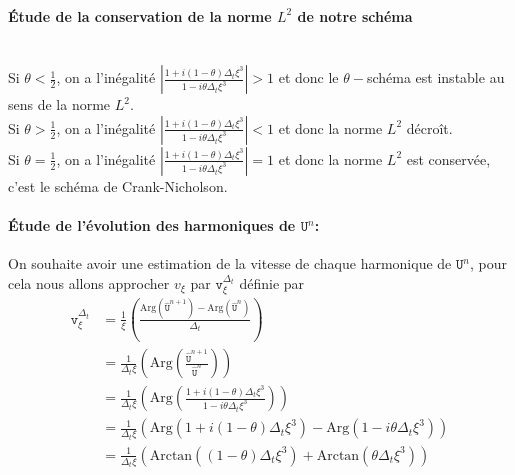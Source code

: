 \documentclass[12pt,a4paper]{article}
\numberwithin{equation}{section}
\begin{document}
\paragraph{Étude de la conservation de la norme $L^2$ de notre schéma}\,
\\

Si $\theta < \frac{1}{2}$, on a l'inégalité $\left|\frac{1 + i (1-\theta)\Delta_t\xi^3}{1 - i\theta \Delta_t\xi^3 }\right|>1 $  et donc le $\theta-$schéma est instable au sens de la norme $L^2$.\\

Si $\theta > \frac{1}{2}$, on a l'inégalité $\left|\frac{1 + i (1-\theta)\Delta_t\xi^3}{1 - i\theta \Delta_t\xi^3 }\right|<1 $ et donc la norme $L^2$ décroît.\\

Si $\theta = \frac{1}{2}$, on a l'inégalité $\left|\frac{1 + i (1-\theta)\Delta_t\xi^3}{1 - i\theta \Delta_t\xi^3 }\right| = 1$ et donc la norme $L^2$ est conservée, c'est le schéma de Crank-Nicholson.\\

\paragraph{Étude de l'évolution des harmoniques de $\texttt{U}^n$:} 
On souhaite avoir une estimation de la vitesse de chaque harmonique de $\texttt{U}^n$, pour cela nous allons approcher $v_\xi$ par $ \texttt{v}_\xi^{\Delta_t}$ définie par
\begin{equation}
\begin{split}
     \texttt{v}_\xi^{\Delta_t} &= \frac{1}{\xi}\left( \frac{\text{Arg}(\widehat{\texttt{U}}^{n+1}) - \text{Arg}(\widehat{\texttt{U}}^{n})}{\Delta_t} \right)
    \\ & =\frac{1}{\Delta_t\xi}\left(\text{Arg}\left( \frac{\widehat{\texttt{U}}^{n+1}}{\widehat{\texttt{U}}^{n}}\right)\right) 
    \\ & = \frac{1}{\Delta_t\xi}\left(\text{Arg}\left(\frac{1 + i (1-\theta)\Delta_t\xi^3}{1 - i\theta \Delta_t\xi^3 }\right)\right)
    \\ & = \frac{1}{\Delta_t\xi}\left(\text{Arg}\left(1 + i (1-\theta)\Delta_t\xi^3\right)- \text{Arg}\left(1 - i\theta \Delta_t\xi^3 \right)\right)
    \\ & = \frac{1}{\Delta_t\xi}\left(\text{Arctan}((1-\theta)\Delta_t\xi^3)+\text{Arctan}(\theta\Delta_t\xi^3)\right)
\end{split}
\end{equation}
\end{document}
